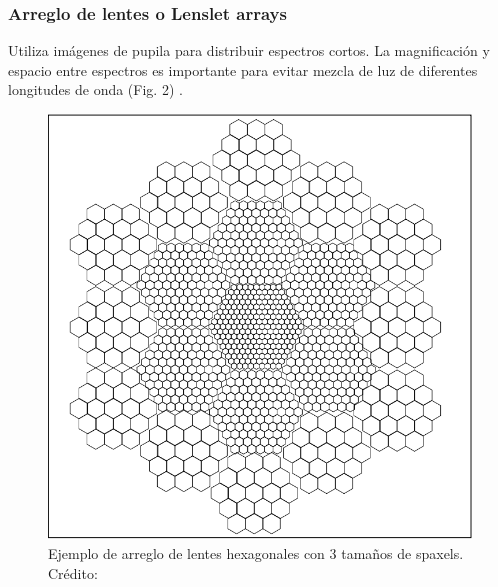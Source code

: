\documentclass[9pt,twocolumn,a4paper]{opticajnl}
\begin{document}
\subsubsection*{Arreglo de lentes o Lenslet arrays}
Utiliza imágenes de pupila para distribuir espectros cortos. La magnificación y espacio entre espectros es importante para evitar mezcla de luz de diferentes longitudes de onda (Fig. 2) \cite{allington2006basic}.
\begin{figure}
    \centering
    \includegraphics[width=0.8\linewidth]{lensletsimg1.png}
    \caption{Ejemplo de arreglo de lentes hexagonales con 3 tamaños de spaxels. Crédito: \cite{schmoll2006design}}
    \label{fig:lensletsimg1}
\end{figure}
\end{document}
